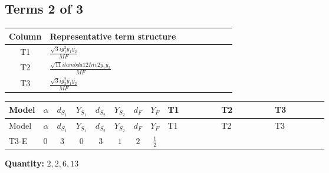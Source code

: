 \documentclass[8pt]{article}
\begin{document}
\begin{landscape}
\subsection*{Terms 2 of 3}
\begin{center}
\begin{tabular}{@{}c >{\raggedright\arraybackslash}p{0.82\linewidth}@{}}
\toprule
Column & Representative term structure \\
\midrule
T1 & \(\displaystyle \frac{\sqrt{3} i g_{1}^{2} \overline{y_{1}} \overline{y_{2}}}{MF}\) \\
\midrule
T2 & \(\displaystyle \frac{\sqrt{11} i lambda12Inv2 \overline{y_{1}} \overline{y_{2}}}{MF}\) \\
\midrule
T3 & \(\displaystyle \frac{\sqrt{3} i g_{2}^{2} \overline{y_{1}} \overline{y_{2}}}{MF}\) \\
\midrule
\bottomrule
\end{tabular}
\end{center}
\smallskip
\tiny
\begin{longtable}{@{}llcccccc >{\raggedright\arraybackslash}p{0.21\linewidth} >{\raggedright\arraybackslash}p{0.21\linewidth} >{\raggedright\arraybackslash}p{0.21\linewidth}@{}}
\toprule
Model & $\alpha$ & $d_{S_1}$ & $Y_{S_1}$ & $d_{S_2}$ & $Y_{S_2}$ & $d_F$ & $Y_F$ & T1 & T2 & T3 \\
\midrule
\endfirsthead
\toprule
Model & $\alpha$ & $d_{S_1}$ & $Y_{S_1}$ & $d_{S_2}$ & $Y_{S_2}$ & $d_F$ & $Y_F$ & T1 & T2 & T3 \\
\midrule
\endhead
T3-E & $0$ & $3$ & $0$ & $3$ & $1$ & $2$ & $\frac{1}{2}$ & \scriptsize\adjustbox{max width=\linewidth}{$\begin{gathered} \frac{\sqrt{3} i g_{1}^{2} \overline{y_{1}} \overline{y_{2}}}{8 MF}\end{gathered}$} & \scriptsize\adjustbox{max width=\linewidth}{$\begin{gathered} \frac{3 \sqrt{11} i lambda12Inv2 \overline{y_{1}} \overline{y_{2}}}{22 MF}\end{gathered}$} & \scriptsize\adjustbox{max width=\linewidth}{$\begin{gathered} \frac{49 \sqrt{3} i g_{2}^{2} \overline{y_{1}} \overline{y_{2}}}{24 MF}\end{gathered}$} \\
\midrule
\bottomrule
\end{longtable}
\clearpage
\noindent\textbf{Quantity: }$\mathrm{2,2,6,13}$\par\smallskip

\end{landscape}
\end{document}
